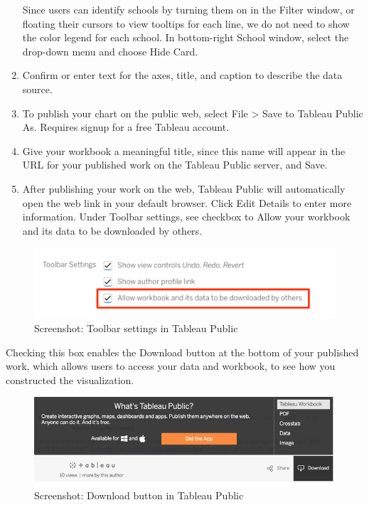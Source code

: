\documentclass[
  english,
]{book}
\begin{document}
\begin{enumerate}
  Since users can identify schools by turning them on in the Filter window, or floating their cursors to view tooltips for each line, we do not need to show the color legend for each school. In bottom-right School window, select the drop-down menu and choose Hide Card.
\item
  Confirm or enter text for the axes, title, and caption to describe the data source.
\item
  To publish your chart on the public web, select File \textgreater{} Save to Tableau Public As. Requires signup for a free Tableau account.
\item
  Give your workbook a meaningful title, since this name will appear in the URL for your published work on the Tableau Public server, and Save.
\item
  After publishing your work on the web, Tableau Public will automatically open the web link in your default browser. Click Edit Details to enter more information. Under Toolbar settings, see checkbox to Allow your workbook and its data to be downloaded by others.
\end{enumerate}

\begin{figure}
\centering
\includegraphics{images/05-chart/tableau-toolbar-settings-allow.png}
\caption{Screenshot: Toolbar settings in Tableau Public}
\end{figure}

Checking this box enables the Download button at the bottom of your published work, which allows users to access your data and workbook, to see how you constructed the visualization.

\begin{figure}
\centering
\includegraphics{images/05-chart/tableau-download.png}
\caption{Screenshot: Download button in Tableau Public}
\end{figure}
\end{document}
